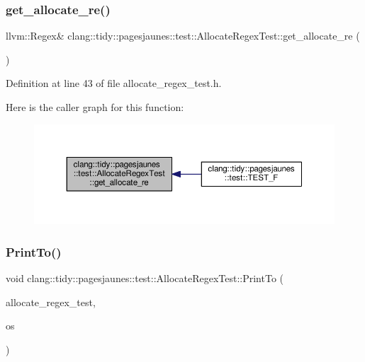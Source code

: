 \subsubsection{\texorpdfstring{get\+\_\+allocate\+\_\+re()}{get\_allocate\_re()}}
{\footnotesize\ttfamily llvm\+::\+Regex\& clang\+::tidy\+::pagesjaunes\+::test\+::\+Allocate\+Regex\+Test\+::get\+\_\+allocate\+\_\+re (\begin{DoxyParamCaption}{ }\end{DoxyParamCaption})\hspace{0.3cm}{\ttfamily [inline]}}



Definition at line 43 of file allocate\+\_\+regex\+\_\+test.\+h.

Here is the caller graph for this function\+:
\nopagebreak
\begin{figure}[H]
\begin{center}
\leavevmode
\includegraphics[width=350pt]{classclang_1_1tidy_1_1pagesjaunes_1_1test_1_1_allocate_regex_test_afbfeaeac380124749cdc8651f3190976_icgraph}
\end{center}
\end{figure}
\mbox{\label{classclang_1_1tidy_1_1pagesjaunes_1_1test_1_1_allocate_regex_test_acf39827995aece77224fe2e553f8b4d2}} 
\subsubsection{\texorpdfstring{Print\+To()}{PrintTo()}}
{\footnotesize\ttfamily void clang\+::tidy\+::pagesjaunes\+::test\+::\+Allocate\+Regex\+Test\+::\+Print\+To (\begin{DoxyParamCaption}\item[{const \hyperlink{classclang_1_1tidy_1_1pagesjaunes_1_1test_1_1_allocate_regex_test}{Allocate\+Regex\+Test} \&}]{allocate\+\_\+regex\+\_\+test,  }\item[{\+::std\+::ostream $\ast$}]{os }\end{DoxyParamCaption})}



